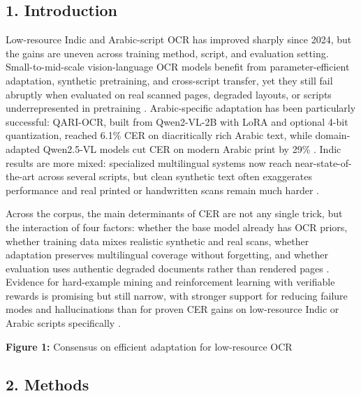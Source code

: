     
    \subsection*{1. Introduction}
    
    
    Low-resource Indic and Arabic-script OCR has improved sharply since 2024, but the gains are uneven across training method, script, and evaluation setting. Small-to-mid-scale vision-language OCR models benefit from parameter-efficient adaptation, synthetic pretraining, and cross-script transfer, yet they still fail abruptly when evaluated on real scanned pages, degraded layouts, or scripts underrepresented in pretraining  \cite{Elkousy2026Domain-Specific} \cite{Wasfy2025QARI-OCR:} \cite{Faraz2026Designing} \cite{Singh2026Can} \cite{Kargaran2026GlotOCR}. Arabic-specific adaptation has been particularly successful: QARI-OCR, built from Qwen2-VL-2B with LoRA and optional 4-bit quantization, reached 6.1\% CER on diacritically rich Arabic text, while domain-adapted Qwen2.5-VL models cut CER on modern Arabic print by 29\%  \cite{Wasfy2025QARI-OCR:} \cite{Elkousy2026Domain-Specific}. Indic results are more mixed: specialized multilingual systems now reach near-state-of-the-art across several scripts, but clean synthetic text often exaggerates performance and real printed or handwritten scans remain much harder  \cite{Faraz2026Designing} \cite{Achyuth2026What} \cite{Singh2026Can} \cite{Mathew2022Towards}.
    
    
    Across the corpus, the main determinants of CER are not any single trick, but the interaction of four factors: whether the base model already has OCR priors, whether training data mixes realistic synthetic and real scans, whether adaptation preserves multilingual coverage without forgetting, and whether evaluation uses authentic degraded documents rather than rendered pages  \cite{Faraz2026Designing} \cite{Hennara2025Baseer:} \cite{Heakl2026DocAtlas:} \cite{Alhomoud2025Cross-Lingual} \cite{Singh2026Can}. Evidence for hard-example mining and reinforcement learning with verifiable rewards is promising but still narrow, with stronger support for reducing failure modes and hallucinations than for proven CER gains on low-resource Indic or Arabic scripts specifically  \cite{Taghadouini2026LightOnOCR:} \cite{Xu2026Multilingual}.
    
    
    \textbf{Figure 1:} Consensus on efficient adaptation for low-resource OCR
    
    
    \subsection*{2. Methods}
    
